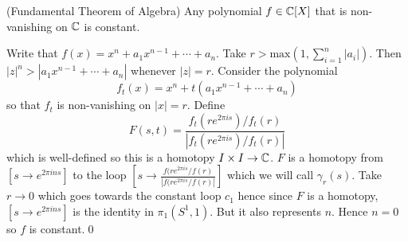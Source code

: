 \documentclass{article}
\begin{document}
\begin{theorem}
	(Fundamental Theorem of Algebra) Any polynomial $ f\in \mathbb{C}[X] $ that is non-vanishing on $ \mathbb{C} $ is constant.
\end{theorem}
\pf Write that $ f(x) = x^n + a_1x^{n-1} + \cdots + a_n $. Take $ r> \mathrm{max}\left(1,\sum_{i=1}^n |a_i|\right) $. Then $ |z|^n > |a_1 x^{n-1} + \cdots + a_n| $ whenever $ |z| = r $. Consider the polynomial
\[
	f_t(x) = x^n + t(a_1 x^{n-1} + \cdots + a_n)
\]
so that $ f_t $ is non-vanishing on $ |x| =r $. Define
\[
F(s,t) = \frac{f_t(re^{2\pi is})/f_t(r)}{|f_t(re^{2\pi is})/f_t(r)|}
\]
which is well-defined so this is a homotopy $ I\times I \to \mathbb{C} $. $ F $ is a homotopy from $ [s\to e^{2\pi ins}] $ to the loop $ \left[s\to\frac{f(re^{2\pi is}/f(r)}{|f(re^{2\pi is}/f(r)|}\right] $ which we will call $ \gamma_r(s) $. Take $ r \to 0 $ which goes towards the constant loop $ c_1 $ hence since $ F $ is a homotopy, $ [s\to e^{2\pi ins}] $ is the identity in $ \pi_1(S^1,1) $. But it also represents $ n $. Hence $ n=0 $ so $ f $ is constant.\qed
\end{document}
